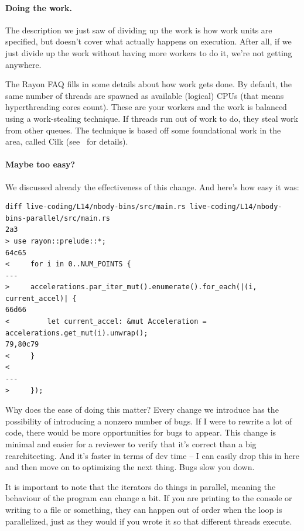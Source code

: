 \paragraph{Doing the work.} The description we just saw of dividing up the work is how work units are specified, but doesn't cover what actually happens on execution. After all, if we just divide up the work without having more workers to do it, we're not getting anywhere.

The Rayon FAQ fills in some details about how work gets done. By default, the same number of threads are spawned as available (logical) CPUs (that means hyperthreading cores count). These are your workers and the work is balanced using a work-stealing technique. If threads run out of work to do, they steal work from other queues. The technique is based off some foundational work in the area, called Cilk (see~\cite{cilk} for details). 

\paragraph{Maybe too easy?}
We discussed already the effectiveness of this change. And here's how easy it was:

{\scriptsize 
\begin{verbatim}
diff live-coding/L14/nbody-bins/src/main.rs live-coding/L14/nbody-bins-parallel/src/main.rs
2a3
> use rayon::prelude::*;
64c65
<     for i in 0..NUM_POINTS {
---
>     accelerations.par_iter_mut().enumerate().for_each(|(i, current_accel)| {
66d66
<         let current_accel: &mut Acceleration = accelerations.get_mut(i).unwrap();
79,80c79
<     }
< 
---
>     });
\end{verbatim}
}

Why does the ease of doing this matter? Every change we introduce has the possibility of introducing a nonzero number of bugs. If I were to rewrite a lot of code, there would be more opportunities for bugs to appear. This change is minimal and easier for a reviewer to verify that it's correct than a big rearchitecting. And it's faster in terms of dev time -- I can easily drop this in here and then move on to optimizing the next thing. Bugs slow you down.

It is important to note that the iterators do things in parallel, meaning the behaviour of the program can change a bit. If you are printing to the console or writing to a file or something, they can happen out of order when the loop is parallelized, just as they would if you wrote it so that different threads execute.


